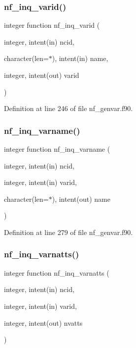 \subsubsection{\texorpdfstring{nf\+\_\+inq\+\_\+varid()}{nf\_inq\_varid()}}
{\footnotesize\ttfamily integer function nf\+\_\+inq\+\_\+varid (\begin{DoxyParamCaption}\item[{integer, intent(in)}]{ncid,  }\item[{character(len=$\ast$), intent(in)}]{name,  }\item[{integer, intent(out)}]{varid }\end{DoxyParamCaption})}



Definition at line 246 of file nf\+\_\+genvar.\+f90.

\mbox{\label{nf__genvar_8f90_ae62acb4cf6e11df12ff2ebb541325de3}} 
\subsubsection{\texorpdfstring{nf\+\_\+inq\+\_\+varname()}{nf\_inq\_varname()}}
{\footnotesize\ttfamily integer function nf\+\_\+inq\+\_\+varname (\begin{DoxyParamCaption}\item[{integer, intent(in)}]{ncid,  }\item[{integer, intent(in)}]{varid,  }\item[{character(len=$\ast$), intent(out)}]{name }\end{DoxyParamCaption})}



Definition at line 279 of file nf\+\_\+genvar.\+f90.

\mbox{\label{nf__genvar_8f90_a7f285e7d982a38d549d68ae233859d67}} 
\subsubsection{\texorpdfstring{nf\+\_\+inq\+\_\+varnatts()}{nf\_inq\_varnatts()}}
{\footnotesize\ttfamily integer function nf\+\_\+inq\+\_\+varnatts (\begin{DoxyParamCaption}\item[{integer, intent(in)}]{ncid,  }\item[{integer, intent(in)}]{varid,  }\item[{integer, intent(out)}]{nvatts }\end{DoxyParamCaption})}



